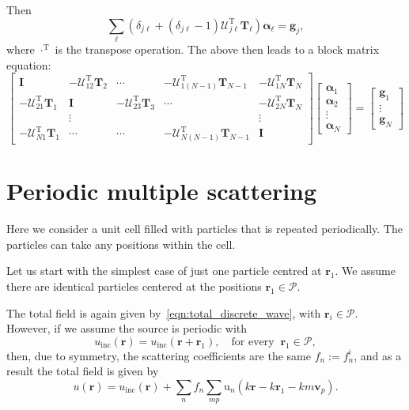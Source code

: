\documentclass[ 12pt, a4paper]{article}
\renewcommand{\vec}[1]{\boldsymbol{#1}}
\begin{document}
 Then
\begin{equation}
 \sum_{\ell}(\delta_{j \ell} +  (\delta_{j \ell}-1) \vec {\mathcal U}_{j \ell}^{\mathrm T} \vec T_\ell) \vec \alpha_\ell  =  \vec g_j,
\end{equation}
where $\cdot ^{\mathrm T}$ is the transpose operation. The above then leads to a block matrix equation:
\begin{equation}
  \begin{bmatrix}
    \vec I & - \vec {\mathcal U}_{1 2}^{\mathrm T}\vec T_2 & \cdots & - \vec {\mathcal U}_{1 (N-1)}^{\mathrm T} \vec T_{N-1} & - \vec {\mathcal U}_{1 N}^{\mathrm T} \vec T_N \\
    - \vec {\mathcal U}_{2 1}^{\mathrm T} \vec T_1 & \vec I &  - \vec {\mathcal U}_{2 3}^{\mathrm T} \vec T_3 & \cdots & - \vec {\mathcal U}_{2 N}^{\mathrm T} \vec T_N \\
     & \vdots & & & \vdots \\
     - \vec {\mathcal U}_{N 1}^{\mathrm T} \vec T_1  & \cdots & \cdots & -  \vec {\mathcal U}_{N (N-1)}^{\mathrm T} \vec T_{N-1} & \vec I
  \end{bmatrix}
  \begin{bmatrix}
    \vec \alpha_1 \\
    \vec \alpha_2 \\
    \vdots \\
    \vec \alpha_N
  \end{bmatrix}
   = \begin{bmatrix}
     \vec g_1 \\
     \vdots \\
     \vec g_N
   \end{bmatrix}
\end{equation}

\section{Periodic multiple scattering}

Here we consider a unit cell filled with particles that is repeated periodically. The particles can take any positions within the cell.

Let us start with the simplest case of just one particle centred at $\vec r_1$. We assume there are identical particles centered at the positions $\vec r_1 \in \mathcal P$.

The total field is again given by~\eqref{eqn:total_discrete_wave}, with $\vec r_i \in \mathcal P$. However, if we assume the source is periodic with
\begin{equation}\label{eqn:incident-periodic}
  u_\mathrm{inc}(\vec r) = u_\mathrm{inc}(\vec r + \vec r_1), \quad \text{for every} \;\; \vec r_1 \in \mathcal P,
\end{equation}
then, due to symmetry, the scattering coefficients are the same $f_n := f^i_n$, and as a result the total field is given by
\[
u(\vec r) = u_\mathrm{inc}(\vec r) + \sum_n f_n \sum_{m p } \mathrm u_n(k \vec r - k \vec r_1 - k m \vec v_p).
\]
\end{document}
